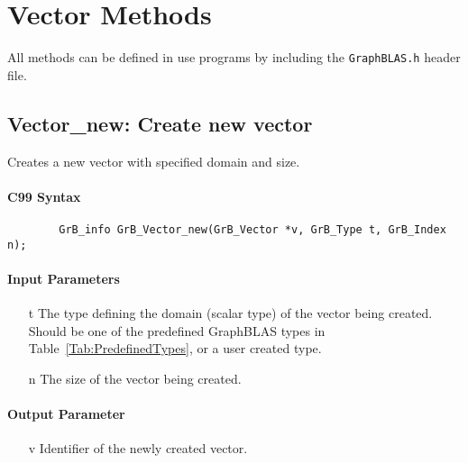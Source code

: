 \section{Vector Methods}

All methods can be defined in use programs by including the {\tt GraphBLAS.h} header file.


\subsection{{\sf Vector\_new}: Create new vector}

Creates a new vector with specified domain and size.

\paragraph{C99 Syntax}

\begin{verbatim}
        GrB_info GrB_Vector_new(GrB_Vector *v, GrB_Type t, GrB_Index n);
\end{verbatim}

\paragraph{Input Parameters}

\begin{itemize}[leftmargin=1.1in]
    \item[{\sf t}] The type defining the domain (scalar type) of the vector being created.
    Should be one of the predefined
    GraphBLAS types in Table~\ref{Tab:PredefinedTypes}, or a user created type.
    \item[{\sf n}] The size of the vector being created.
\end{itemize}

\paragraph{Output Parameter}

\begin{itemize}[leftmargin=1.1in]
    \item[{\sf v}] Identifier of the newly created vector.
\end{itemize}

